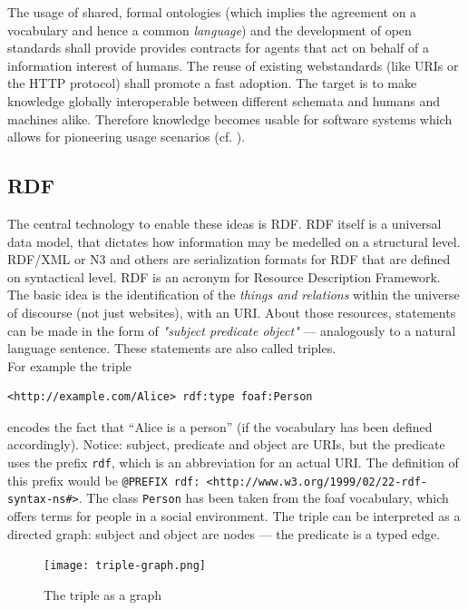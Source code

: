 The usage of shared, formal ontologies (which implies the agreement on a vocabulary and hence a common \textit{language}) and the development of open standards shall provide provides contracts for agents that act on behalf of a information interest of humans. 
The reuse of existing webstandards (like URIs or the HTTP protocol) shall promote a fast adoption. 
The target is to make knowledge globally interoperable between different schemata and humans and machines alike. 
Therefore knowledge becomes usable for software systems which allows for pioneering usage scenarios (cf. \cite{hitzler}).\\

\subsection{RDF}
The central technology to enable these ideas is RDF. 
RDF itself is a universal data model, that dictates how information may be medelled on a structural level. RDF/XML or  N3 and others are serialization formats for RDF that are defined on syntactical level.
RDF is an acronym for Resource Description Framework. 
The basic idea is the identification of the \textit{things and relations} within the universe of discourse (not just websites), with an URI. 
About those resources, statements can be made in the form of \textit{"subject predicate object"} --- analogously to a natural language sentence. 
These statements are also called triples.\\
For example the triple 
\begin{lstlisting}[style=N3]
<http://example.com/Alice> rdf:type foaf:Person
\end{lstlisting}
encodes the fact that ``Alice is a person'' (if the vocabulary has been defined accordingly). 
Notice: subject, predicate and object are URIs, but the predicate uses the prefix \texttt{rdf}, which is an abbreviation for an actual URI. 
The definition of this prefix would be \verb+@PREFIX rdf: <http://www.w3.org/1999/02/22-rdf-syntax-ns#>+. 
The class \texttt{Person} has been taken from the foaf vocabulary, which offers terms for people in a social environment. 
The triple can be interpreted as a directed graph: subject and object are nodes --- the predicate is a typed edge.\\
\begin{figure}[h]
  \centering
    \texttt{[image: triple-graph.png]}
  \caption{The triple as a graph}
  \label{fig:triple-graph}
\end{figure}

